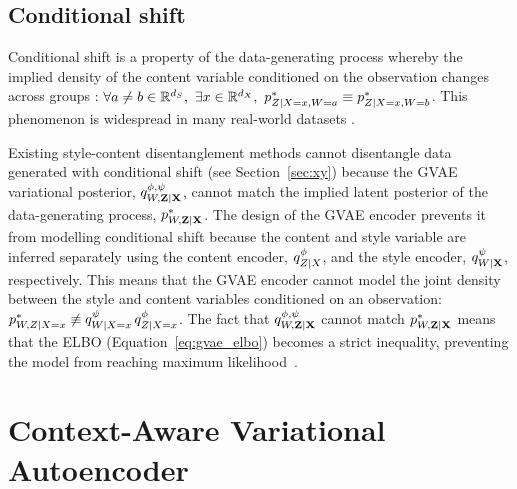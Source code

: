 \documentclass[../thesis.tex]{subfiles}
\begin{document}

\subsection{Conditional shift}

Conditional shift is a property of the data-generating process whereby the implied density of the content variable conditioned on the observation changes across groups \citep{zhangDomainAdaptationTarget2013}: $\forall \myvect{a} \neq \myvect{b} \in \mathbb{R}^{\mydim{s}}, ~ \exists \myvect{x} \in \mathbb{R}^{\mydim{x}}, ~ \myfunc{p}^{*}_{\myrv{z} | \myrv{x} = \myvect{x}, \myrv{w} = \myvect{a}} \equiv \myfunc{p}^{*}_{\myrv{z} | \myrv{x} = \myvect{x}, \myrv{w} = \myvect{b}}$. This phenomenon is widespread in many real-world datasets \citep{liuNeedLanguageDescribing2023}.

Existing style-content disentanglement methods cannot disentangle data generated with conditional shift (see Section~\ref{sec:xy}) because the GVAE variational posterior, $\myfunc{q}^{\phi, \psi}_{\myrv{w}, \mygroup{\myrv{z}} | \mygroup{\myrv{x}}}$, cannot match the implied latent posterior of the data-generating process, $\myfunc{p}^{*}_{\myrv{w}, \mygroup{\myrv{z}} | \mygroup{\myrv{x}}}$. The design of the GVAE encoder prevents it from modelling conditional shift because the content and style variable are inferred separately using the content encoder, $\myfunc{q}^{\phi}_{\myrv{z} | \myrv{x}}$, and the style encoder, $\myfunc{q}^{\psi}_{\myrv{w} | \mygroup{\myrv{x}}}$, respectively. This means that the GVAE encoder cannot model the joint density between the style and content variables conditioned on an observation: $\myfunc{p}^{*}_{\myrv{w}, \myrv{z} | \myrv{x} = \myvect{x}} \not\equiv \myfunc{q}^{\psi}_{\myrv{w} | \myrv{x} = \myvect{x}} \, \myfunc{q}^{\phi}_{\myrv{z} | \myrv{x} = \myvect{x}}$. The fact that $\myfunc{q}^{\phi, \psi}_{\myrv{w}, \mygroup{\myrv{z}} | \mygroup{\myrv{x}}}$ cannot match $\myfunc{p}^{*}_{\myrv{w}, \mygroup{\myrv{z}} | \mygroup{\myrv{x}}}$ means that the ELBO (Equation~\ref{eq:gvae_elbo}) becomes a strict inequality, preventing the model from reaching maximum likelihood~\citep{bleiVariationalInferenceReview2017}.

\section{Context-Aware Variational Autoencoder}
\end{document}
